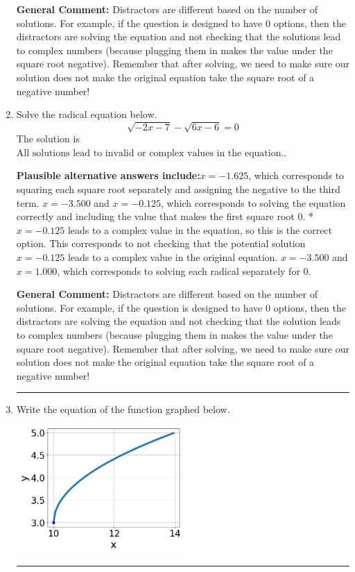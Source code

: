 \documentclass{extbook}[14pt]
\newcommand{\litem}[1]{\item #1

\rule{\textwidth}{0.4pt}}
\begin{document}
\begin{enumerate}
{\textbf{General Comment:} Distractors are different based on the number of solutions. For example, if the question is designed to have 0 options, then the distractors are solving the equation and not checking that the solutions lead to complex numbers (because plugging them in makes the value under the square root negative). Remember that after solving, we need to make sure our solution does not make the original equation take the square root of a negative number!
}
\litem{
Solve the radical equation below.
\[ \sqrt{-2 x - 7} - \sqrt{6 x - 6} = 0 \]The solution is \( \text{All solutions lead to invalid or complex values in the equation.} \).\begin{enumerate}[label=\Alph*.]
\textbf{Plausible alternative answers include:}$x = -1.625$, which corresponds to squaring each square root separately and assigning the negative to the third term.
$x = -3.500$ and $x = -0.125$, which corresponds to solving the equation correctly and including the value that makes the first square root 0.
*$x = -0.125$ leads to a complex value in the equation, so this is the correct option.
This corresponds to not checking that the potential solution $x = -0.125$ leads to a complex value in the original equation.
$x = -3.500$ and $x = 1.000$, which corresponds to solving each radical separately for 0.
\end{enumerate}

\textbf{General Comment:} Distractors are different based on the number of solutions. For example, if the question is designed to have 0 options, then the distractors are solving the equation and not checking that the solution leads to complex numbers (because plugging them in makes the value under the square root negative). Remember that after solving, we need to make sure our solution does not make the original equation take the square root of a negative number!
}
\litem{
Write the equation of the function graphed below.

\begin{center}
    \includegraphics[width=0.5\textwidth]{../Figures/radicalGraphToEquationA.png}
\end{center}


}
\end{enumerate}
\end{document}
